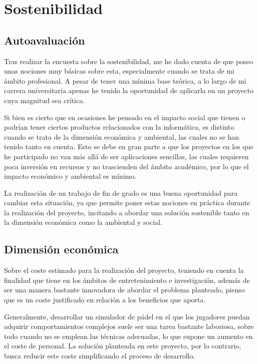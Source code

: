 \chapter{Sostenibilidad}\label{sostenibilidad}
\section{Autoavaluación}

Tras realizar la encuesta sobre la sostenibilidad, me he dado cuenta de que poseo unas nociones muy básicas sobre esta, especialmente cuando se trata de mi ámbito profesional. A pesar de tener una mínima base teórica, a lo largo de mi carrera universitaria apenas he tenido la oportunidad de aplicarla en un proyecto cuya magnitud sea crítica.

Si bien es cierto que en ocasiones he pensado en el impacto social que tienen o podrían tener ciertos productos relacionados con la informática, es distinto cuando se trata de la dimensión económica y ambiental, las cuales no se han tenido tanto en cuenta. Esto se debe en gran parte a que los proyectos en los que he participado no van más allá de ser aplicaciones sencillas, las cuales requieren poca inversión en recursos y no trascienden del ámbito académico, por lo que el impacto económico y ambiental es mínimo.

La realización de un trabajo de fin de grado es una buena oportunidad para cambiar esta situación, ya que permite poner estas nociones en práctica durante la realización del proyecto, incitando a abordar una solución sostenible tanto en la dimensión económica como la ambiental y social.

\section{Dimensión económica}

Sobre el coste estimado para la realización del proyecto, teniendo en cuenta la finalidad que tiene en los ámbitos de entretenimiento e investigación, además de ser una manera bastante innovadora de abordar el problema planteado, pienso que es un coste justificado en relación a los beneficios que aporta.

Generalmente, desarrollar un simulador de pádel en el que los jugadores puedan adquirir comportamientos complejos suele ser una tarea bastante laboriosa, sobre todo cuando no se emplean las técnicas adecuadas, lo que supone un aumento en el coste de personal. La solución planteada en este proyecto, por lo contrario, busca reducir este coste simplificando el proceso de desarrollo.

